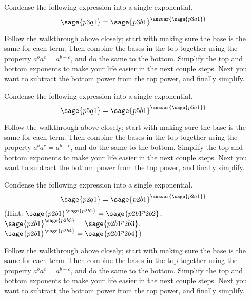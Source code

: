 \documentclass{ximera}
\begin{document}
\begin{problem}
    Condense the following expression into a single exponential.\\
    
    \[
        \sage{p3q1} = {\sage{p3b1}}^{\answer{\sage{p3a1}}}
    \]
    \begin{feedback}
        Follow the walkthrough above closely; start with making sure the base is the same for each term. Then combine the bases in the top together using the property $a^ba^c = a^{b+c}$, and do the same to the bottom. Simplify the top and bottom exponents to make your life easier in the next couple steps. Next you want to subtract the bottom power from the top power, and finally simplify.
    \end{feedback}
\end{problem}

\begin{problem}
    Condense the following expression into a single exponential.\\
    
    \[
        \sage{p5q1} = {\sage{p5b1}}^{\answer{\sage{p5a1}}}
    \]
    \begin{feedback}
        Follow the walkthrough above closely; start with making sure the base is the same for each term. Then combine the bases in the top together using the property $a^ba^c = a^{b+c}$, and do the same to the bottom. Simplify the top and bottom exponents to make your life easier in the next couple steps. Next you want to subtract the bottom power from the top power, and finally simplify.
    \end{feedback}
\end{problem}

\begin{problem}
    Condense the following expression into a single exponential.\\
    
    \[
        \sage{p2q1} = {\sage{p2b1}}^{\answer{\sage{p2a1}}}
    \]
    (Hint: $\sage{p2b1}^{\sage{p2b2}} = \sage{p2b1^p2b2}$, 
        $\sage{p2b1}^{\sage{p2b3}} = \sage{p2b1^p2b3}$, 
        $\sage{p2b1}^{\sage{p2b4}} = \sage{p2b1^p2b4}$)
    \begin{feedback}
        Follow the walkthrough above closely; start with making sure the base is the same for each term. Then combine the bases in the top together using the property $a^ba^c = a^{b+c}$, and do the same to the bottom. Simplify the top and bottom exponents to make your life easier in the next couple steps. Next you want to subtract the bottom power from the top power, and finally simplify.
    \end{feedback}
\end{problem}
\end{document}

